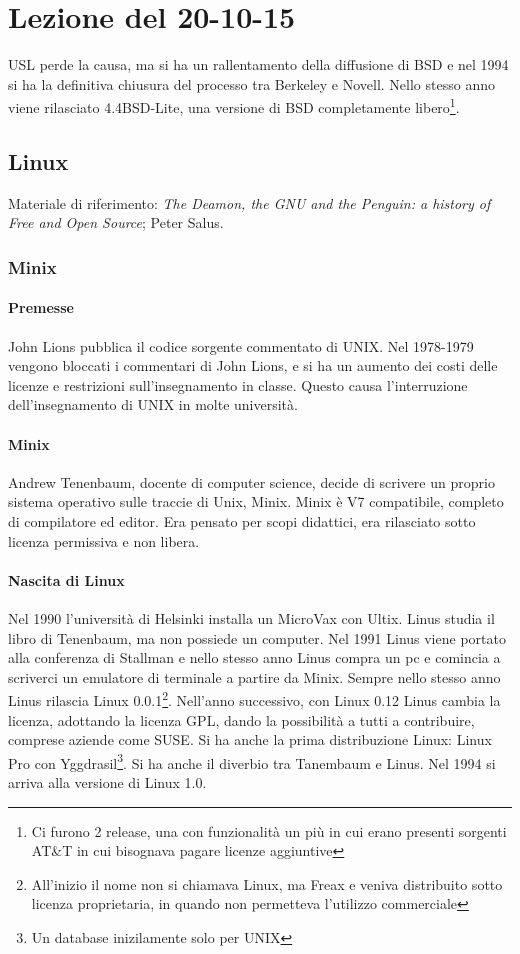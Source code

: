 \section{Lezione del 20-10-15}

USL perde la causa, ma si ha un rallentamento della diffusione di BSD e nel 1994 si ha la definitiva chiusura del processo tra Berkeley e Novell. Nello stesso anno viene rilasciato 4.4BSD-Lite, una versione di BSD completamente libero\footnote{Ci furono 2 release, una con funzionalit\`a un pi\`u in cui erano presenti sorgenti AT\&T in cui bisognava pagare licenze aggiuntive}.

\subsection{Linux}

Materiale di riferimento: \textit{The Deamon, the GNU and the Penguin: a history of Free and Open Source}; Peter Salus.

\subsubsection{Minix}

\paragraph*{Premesse} John Lions pubblica il codice sorgente commentato di UNIX. Nel 1978-1979 vengono bloccati i commentari di John Lions, e si ha un aumento dei costi delle licenze e restrizioni sull'insegnamento in classe. Questo causa l'interruzione dell'insegnamento di UNIX in molte universit\`a.

\paragraph*{Minix} Andrew Tenenbaum, docente di computer science, decide di scrivere un proprio sistema operativo sulle traccie di Unix, Minix. Minix \`e V7 compatibile, completo di compilatore ed editor. Era pensato per scopi didattici, era rilasciato sotto licenza permissiva e non libera.

\paragraph*{Nascita di Linux} Nel 1990 l'universit\`a di Helsinki installa un MicroVax con Ultix. Linus studia il libro di Tenenbaum, ma non possiede un computer. Nel 1991 Linus viene portato alla conferenza di Stallman e nello stesso anno Linus compra un pc e comincia a scriverci un emulatore di terminale a partire da Minix. Sempre nello stesso anno Linus rilascia Linux 0.0.1\footnote{All'inizio il nome non si chiamava Linux, ma Freax e veniva distribuito sotto licenza proprietaria, in quando non permetteva l'utilizzo commerciale}. Nell'anno successivo, con Linux 0.12 Linus cambia la licenza, adottando la licenza GPL, dando la possibilit\`a a tutti a contribuire, comprese aziende come SUSE. Si ha anche la prima distribuzione Linux: Linux Pro con Yggdrasil\footnote{Un database inizilamente solo per UNIX}. Si ha anche il diverbio tra Tanembaum e Linus. Nel 1994 si arriva alla versione di Linux 1.0.

